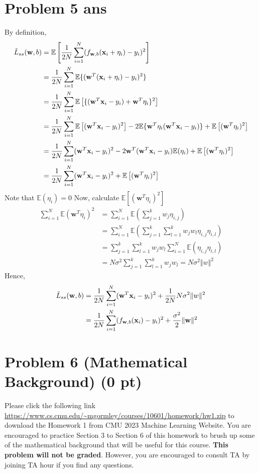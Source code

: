 \documentclass{article}
\begin{document}
\section*{Problem 5 ans}
By definition,
\begin{align*}
    {\tilde L}_{ss}({\bf w},b) &= {\mathbb E}\left[ \frac{1}{2N}\sum_{i=1}^{N}(f_{{\bf w},b}({\bf x}_i + {\bf \eta}_i)-y_i)^2 \right]\\
    &= \frac{1}{2N}\sum_{i=1}^N \mathbb{E}\{(\mathbf{w}^T(\mathbf{x}_i + \eta_i) - y_i)^2\}\\
    &= \frac{1}{2N}\sum_{i=1}^N\mathbb{E}\left[ \{(\mathbf{w}^T\mathbf{x}_i - y_i) + \mathbf{w}^T\eta_i\}^2\right]\\
    &= \frac{1}{2N}\sum_{i=1}^N \mathbb{E} \left[ (\mathbf{w}^T\mathbf{x}_i - y_i)^2\right] - 2\mathbb{E}\{\mathbf{w}^T\eta_i(\mathbf{w}^T\mathbf{x}_i - y_i)\} + \mathbb{E}\left[(\mathbf{w}^T\eta_i)^2\right]\\
    &= \frac{1}{2N}\sum_{i=1}^N (\mathbf{w}^T\mathbf{x}_i - y_i)^2 - 2\mathbf{w}^T(\mathbf{w}^T\mathbf{x}_i - y_i)\mathbb{E}(\eta_i) + \mathbb{E}\left[(\mathbf{w}^T\eta_i)^2\right]\\
    &= \frac{1}{2N}\sum_{i=1}^N (\mathbf{w}^T\mathbf{x}_i - y_i)^2 + \mathbb{E}\left[(\mathbf{w}^T\eta_i)^2\right]
\end{align*}
Note that $\mathbb{E}(\eta_i) = 0$
Now, calculate $\mathbb{E}\left[(\mathbf{w}^T\eta_i)^2\right]$
\begin{align*}
    \sum_{i=1}^N\mathbb{E}(\mathbf{w}^T\eta_i)^2 &= \sum_{i=1}^N\mathbb{E}(\sum_{j=1}^k w_j\eta_{i, j})\\
    &= \sum_{i=1}^N\mathbb{E}(\sum_{j = 1}^k\sum_{l=1}^k w_j w_l \eta_{i, j}\eta_{i, l})\\
    &= \sum_{j = 1}^k\sum_{l=1}^kw_j w_l\sum_{i=1}^N\mathbb{E}(\eta_{i, j}\eta_{i, l})\\
    &= N\sigma^2 \sum_{j = 1}^k\sum_{l=1}^kw_j w_l = N\sigma^2\Vert w\Vert^2
\end{align*}
Hence, 
\begin{align*}
    {\tilde L}_{ss}({\bf w},b) &= \frac{1}{2N}\sum_{i=1}^N (\mathbf{w}^T\mathbf{x}_i - y_i)^2 + \frac{1}{2N} N\sigma^2\Vert w\Vert^2\\
    &= \frac{1}{2N}\sum_{i=1}^{N}(f_{{\bf w},b}({\bf x}_i)-y_i)^2 + \frac{\sigma^2}{2}\|{\bf w}\|^2
\end{align*}


\section*{Problem 6 (Mathematical Background) (0 pt)}
Please click the following link \url{https://www.cs.cmu.edu/~mgormley/courses/10601/homework/hw1.zip}
to download the Homework 1 from CMU 2023 Machine Learning Website. You are encouraged to practice Section 3 to Section 6 of this homework to brush up some of the mathematical background that will be useful for this course. \textbf{This problem will not be graded}. However, you are encouraged to consult TA by joining TA hour if you find any questions.
\end{document}
